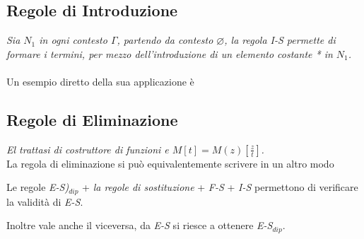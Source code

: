 \documentclass[10pt,a4paper, italian]{book}
\begin{document}
\subsection{Regole di Introduzione}
\label{subsec:introduzione}
\begin{prooftree}
\end{prooftree}
\textit{Sia $N_1$ in ogni contesto $\Gamma$, partendo da contesto $\varnothing$, la regola I-S permette di formare i termini, per mezzo dell'introduzione di un elemento costante * in $N_1$.}\\\\
Un esempio diretto della sua applicazione \`e
\begin{prooftree}
\end{prooftree}

\subsection{Regole di Eliminazione}
\label{subsec:eliminazione}
\begin{prooftree}
\end{prooftree}
\noindent
\textit{El trattasi di costruttore di funzioni e $M[t] = M(z)[\frac{z}{t}]$.}
\\
La regola di eliminazione si pu\`o equivalentemente scrivere in un altro modo
\begin{prooftree}
\end{prooftree}
Le regole \textit{E-S)$_{dip}$} + \textit{la regole di sostituzione} + \textit{F-S} + \textit{I-S} permettono di verificare la validit\`a di \textit{E-S}.
\begin{prooftree}
\end{prooftree}
\noindent
Inoltre vale anche il viceversa, da \textit{E-S} si riesce a ottenere \textit{E-S$_{dip}$}.
\end{document}
